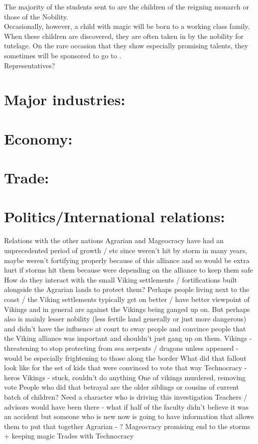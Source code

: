 \documentclass[blue]{GL2020}
\begin{document}
The majority of the students sent to \pSchool{} are the children of the reigning monarch or those of the Nobility.\\

Occasionally, however, a child with magic will be born to a working class family.  When these children are discovered, they are often taken in by the nobility for tutelage.  On the rare occasion that they show especially promising talents, they sometimes will be sponsored to go to \pSchool{}.\\

Representatives?

\section{Major industries:}



\section{Economy:}

\section{Trade:}

\section{Politics/International relations:}

Relations with the other nations
Agrarian and Mageocracy have had an unprecedented period of growth / etc since weren’t hit by storm in many years, maybe weren’t fortifying properly because of this alliance and so would be extra hurt if storms hit them because were depending on the alliance to keep them safe
How do they interact with the small Viking settlements / fortifications built alongside the Agrarian lands to protect them?  Perhaps people living next to the coast / the Viking settlements typically get on better / have better viewpoint of Vikings and in general are against the Vikings being ganged up on.  But perhaps also is mainly lesser nobility (less fertile land generally or just more dangerous) and didn’t have the influence at court to sway people and convince people that the Viking alliance was important and shouldn’t just gang up on them.  
Vikings - threatening to stop protecting from sea serpents / dragons unless appeased - would be especially frightening to those along the border
What did that fallout look like for the set of kids that were convinced to vote that way
Technocracy - heros
Vikings - stuck, couldn’t do anything
One of vikings murdered, removing vote
People who did that betrayal are the older siblings or cousins of current batch of children?
Need a character who is driving this investigation
Teachers / advisors would have been there - what if half of the faculty didn’t believe it was an accident but someone who is new now is going to have information that allows them to put that together
Agrarian - ?
Mageocracy promising end to the storms + keeping magic 
Trades with Technocracy
\end{document}
